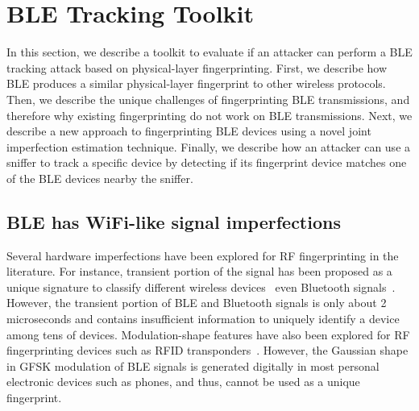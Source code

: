
\section{BLE Tracking Toolkit}
\label{sec:methodology}

In this section, we describe a toolkit to evaluate if an attacker can perform a
BLE tracking attack based on physical-layer fingerprinting. First, we describe
how BLE produces a similar physical-layer fingerprint to other wireless
protocols. Then, we describe the unique challenges of fingerprinting BLE
transmissions, and therefore why existing fingerprinting do not work on BLE
transmissions. Next, we describe a new approach to fingerprinting BLE devices
using a novel joint imperfection estimation technique. Finally, we describe how
an attacker can use a sniffer to track a specific device by detecting if its
fingerprint device matches one of the BLE devices nearby the sniffer.


\subsection{BLE has WiFi-like signal imperfections}


Several hardware imperfections have been explored for RF fingerprinting in the literature. 
For instance, transient portion of the signal has been proposed as a unique signature to 
classify different wireless devices~\cite{extraction_rehman, transientID_danev} even Bluetooth
signals~\cite{transientBT_Hall}. However, the transient portion of BLE and Bluetooth signals
is only about 2 microseconds and contains insufficient information to uniquely identify 
a device among tens of devices. Modulation-shape features have also been explored for RF
fingerprinting devices such as RFID transponders~\cite{rfidphysical_danev}. However, 
the Gaussian shape in GFSK modulation of BLE signals is generated digitally in most 
personal electronic devices such as phones, and thus, cannot be used as a unique fingerprint.
\fi




